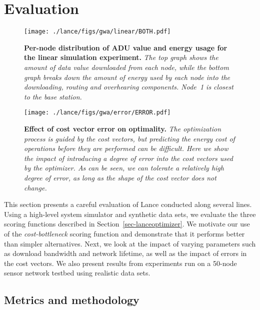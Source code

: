 \vspace{0.2in}
\section{Evaluation}
\label{sec-evaluation}

\begin{figure*}[t]
\begin{center}
\texttt{[image: ./lance/figs/gwa/linear/BOTH.pdf]}
\end{center}
\caption{\small {\bf Per-node distribution of ADU value and energy
usage for the linear simulation experiment.} 
{\em The top graph shows the amount of
data value downloaded from each node, while the bottom graph breaks down the
amount of energy used by each node into the downloading, routing and
overhearing components. Node~1 is closest to the base station.}}
\label{sec-eval-figlinear}
\end{figure*}

\begin{figure}[t]
\begin{center}
\texttt{[image: ./lance/figs/gwa/error/ERROR.pdf]}
\end{center}
\caption{\small {\bf Effect of cost vector error on optimality.} 
{\em The
optimization process is guided by the cost vectors, but predicting the energy
cost of operations before they are performed can be difficult.  Here we show
the impact of introducing a degree of error into the cost vectors used by the
optimizer.  As can be seen, we can tolerate a relatively high degree of
error, as long as the shape of the cost vector does not change.}}
\label{sec-eval-figerror}
\end{figure}

This section presents a careful evaluation of Lance conducted along several
lines.  Using a high-level system simulator and synthetic data sets, we
evaluate the three scoring functions described in
Section~\ref{sec-lanceoptimizer}. We motivate our use of the
\emph{cost-bottleneck} scoring function and demonstrate that it performs
better than simpler alternatives.  Next, we look at the impact of varying
parameters such as download bandwidth and network lifetime, as well
as the impact of errors in the cost vectors.
We also present results from experiments run on a 50-node sensor 
network testbed using realistic data sets.

\subsection{Metrics and methodology}

